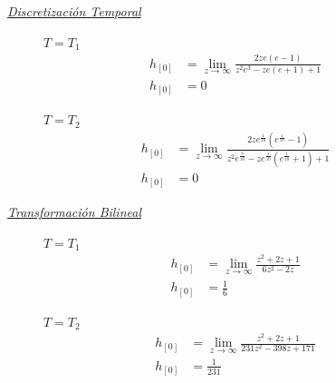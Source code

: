 \documentclass[a4paper,12pt]{report}
\begin{document}
\begin{enumerate}[label=\alph*), left=0pt]
                {\centering\underline{\textit{Discretización Temporal}}\par}
                \begin{figure}[h!]
                    \centering
                    \begin{minipage}{0.4\textwidth}
                        \centering
                        $T = T_1$
                        \begin{align*}
                            h_{[0]} &= \lim_{z \to \infty} \frac{2 z e (e - 1)}{z^2 e^3 - z e (e + 1) + 1}\\
                            h_{[0]} &= 0
                        \end{align*}
                    \end{minipage}
                    \hspace{0.5cm}
                    \begin{minipage}{0.4\textwidth}
                        \centering
                        $T = T_2$
                        \begin{align*}
                            h_{[0]} &= \lim_{z \to \infty} \frac{2 z e^{\frac{1}{10}} (e^{\frac{1}{10}} - 1)}
                                {z^2 e^{\frac{3}{10}} - z  e^{\frac{1}{10}}(e^{\frac{1}{10}} + 1) + 1}\\
                            h_{[0]} &= 0
                        \end{align*}
                    \end{minipage}
                \end{figure}

                {\centering\underline{\textit{Transformación Bilineal}}\par}
                \begin{figure}[h!]
                    \centering
                    \begin{minipage}{0.4\textwidth}
                        \centering
                        $T = T_1$
                        \begin{align*}
                            h_{[0]} &= \lim_{z \to \infty} \frac{z^2 + 2z + 1}{6z^2 - 2z}\\
                            h_{[0]} &= \frac{1}{6}
                        \end{align*}
                    \end{minipage}
                    \hspace{0.5cm}
                    \begin{minipage}{0.4\textwidth}
                        \centering
                        $T = T_2$
                        \begin{align*}
                            h_{[0]} &= \lim_{z \to \infty} \frac{z^2 + 2z + 1}{231z^2 - 398z + 171}\\
                            h_{[0]} &= \frac{1}{231}
                        \end{align*}
                    \end{minipage}
                \end{figure}


\end{enumerate}
\end{document}
